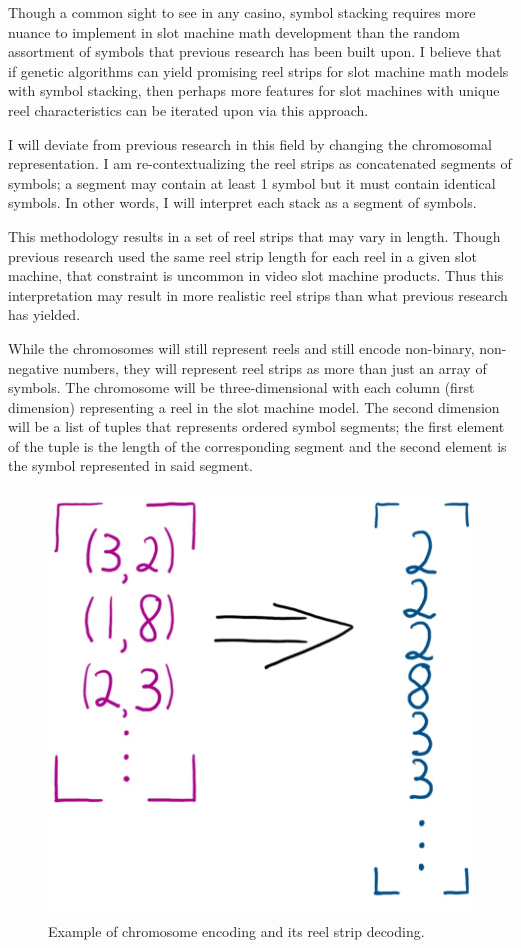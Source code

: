\documentclass[11pt]{article} %
\begin{document}
\par
Though a common sight to see in any casino, symbol stacking requires more nuance to implement in slot machine math development than the random assortment of symbols that previous research has been built upon.
I believe that if genetic algorithms can yield promising reel strips for slot machine math models with symbol stacking, then perhaps more features for slot machines with unique reel characteristics can be iterated upon via this approach.
\par
I will deviate from previous research in this field by changing the chromosomal representation.
I am re-contextualizing the reel strips as concatenated segments of symbols; a segment may contain at least 1 symbol but it must contain identical symbols.
In other words, I will interpret each stack as a segment of symbols.
\par
This methodology results in a set of reel strips that may vary in length.
Though previous research used the same reel strip length for each reel in a given slot machine, that constraint is uncommon in video slot machine products.
Thus this interpretation may result in more realistic reel strips than what previous research has yielded.
\par
While the chromosomes will still represent reels and still encode non-binary, non-negative numbers, they will represent reel strips as more than just an array of symbols.
The chromosome will be three-dimensional with each column (first dimension) representing a reel in the slot machine model.
The second dimension will be a list of tuples that represents ordered symbol segments; the first element of the tuple is the length of the corresponding segment and the second element is the symbol represented in said segment. 
\begin{figure}[H]
\centering
\includegraphics[scale=0.25]{Chromosome_Encoding}
\caption{Example of chromosome encoding and its reel strip decoding.}
\label{encoding}
\end{figure}
\end{document}
